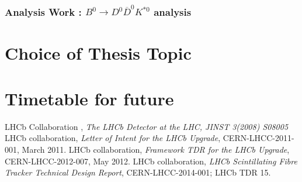 \documentclass[paper=a4, fontsize=10pt]{scrartcl}
\numberwithin{equation}{section}		%
\numberwithin{figure}{section}			%
\numberwithin{table}{section}				%
\begin{document}

\subsubsection{Analysis Work : $B^{0}\rightarrow D^{0}\overline{D}^{0}K^{\ast 0}$ analysis}
 


\section{Choice of Thesis Topic}


\section{Timetable for future}



\begin{thebibliography}{100}
 LHCb Collaboration , \textit{The LHCb Detector at the LHC, JINST 3(2008) S08005}
 LHCb collaboration, \textit{Letter of Intent for the LHCb Upgrade}, CERN-LHCC-2011-001, March 2011.
 LHCb collaboration, \textit{Framework TDR for the LHCb Upgrade}, CERN-LHCC-2012-007, May 2012.
 LHCb collaboration, \textit{LHCb Scintillating Fibre Tracker Technical Design Report}, CERN-LHCC-2014-001; LHCb TDR 15.
\end{thebibliography}
\end{document}
